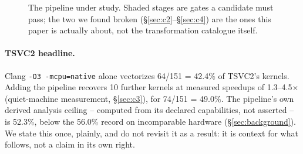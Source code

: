 \documentclass[sigconf,review,anonymous]{acmart}
\begin{document}
\begin{figure}[t]
\centering
{}
\caption{The pipeline under study. Shaded stages are gates a candidate must
pass; the two we found broken (\S\ref{sec:c2}--\S\ref{sec:c4}) are the ones
this paper is actually about, not the transformation catalogue itself.}
\label{fig:pipeline}
\end{figure}

\paragraph{TSVC2 headline.} Clang \texttt{-O3 -mcpu=native} alone vectorizes
64/151 = 42.4\% of TSVC2's kernels. Adding the pipeline recovers 10 further
kernels at measured speedups of 1.3--4.5$\times$ (quiet-machine
measurement, \S\ref{sec:c3}), for 74/151 = 49.0\%. The pipeline's own
derived analysis ceiling -- computed from its declared capabilities, not
asserted -- is 52.3\%, below the 56.0\% record on incomparable hardware
(\S\ref{sec:background}). We state this once, plainly, and do not revisit it
as a result: it is context for what follows, not a claim in its own right.
\end{document}
